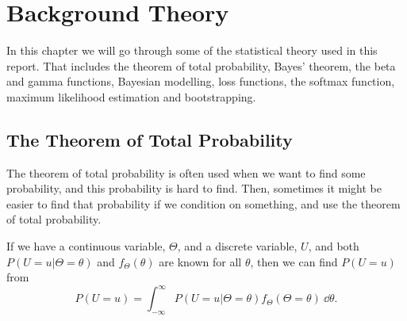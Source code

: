 \newpage
\chapter{Background Theory}
In this chapter we will go through some of the statistical theory used in this report. That includes the theorem of total probability, Bayes' theorem, the beta and gamma functions, Bayesian modelling, loss functions, the softmax function, maximum likelihood estimation and bootstrapping.  

\section{The Theorem of Total Probability}
The theorem of total probability is often used when we want to find some probability, and this probability is hard to find. Then, sometimes it might be easier to find that probability if we condition on something, and use the theorem of total probability. 
\begin{theorem}
If we have a continuous variable, $\Theta$, and a discrete variable, $U$, and both $P(U=u|\Theta=\theta)$ and  $f_\Theta(\theta)$ are known for all $\theta$, then we can find $P(U=u)$ from \citep{schay2016introduction} 
\begin{equation}
    \label{lawoftotprob}
    P(U=u) = \int_{-\infty}^{\infty} P(U=u|\Theta=\theta)f_{\Theta}(\Theta=\theta) \: \dd \theta.
\end{equation}
\end{theorem}

\begin{comment}
In \citet{schay2016introduction}, the theorem of total probability for continuous variables is stated as 
\begin{theorem}[Theorem of Total Probability, Continuous Versions]
 For a continuous random variable Y and any event A, if $f_{Y|A}$ and $f_Y$ exists for all y, then
\begin{equation}
    P(A) = \int_{-\infty}^{\infty}
    P(A|Y=y)f_Y(y) dy.
\end{equation}
\end{theorem}
\end{comment}




